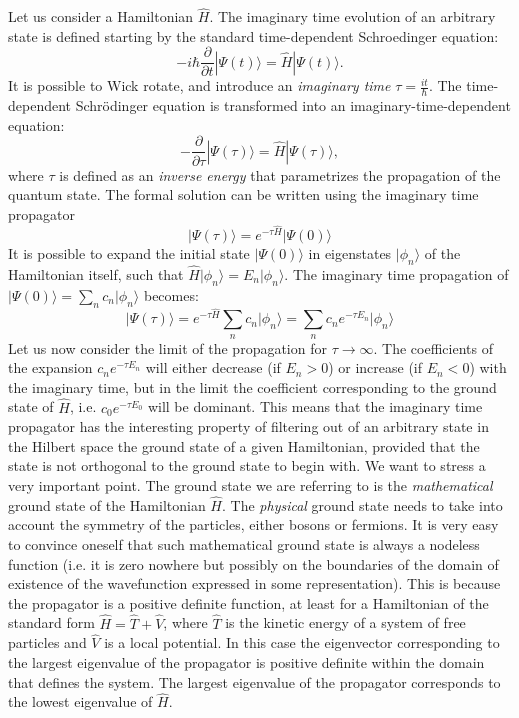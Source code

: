 Let us consider a Hamiltonian $\hat{H}$. The imaginary time evolution of an arbitrary state is defined starting by the standard time-dependent Schroedinger equation:
\begin{equation}
-i\hbar\frac{\partial}{\partial t}|\Psi(t)\rangle = \hat{H}|\Psi(t)\rangle.
\end{equation}
It is possible to Wick rotate, and introduce an {\it imaginary time} $\tau=\frac{it}{\hbar}$. The 
time-dependent Schr\"odinger equation is transformed into an imaginary-time-dependent equation:
\begin{equation}
-\frac{\partial}{\partial \tau}|\Psi(\tau)\rangle = \hat{H}|\Psi(\tau)\rangle,
\end{equation}
where
$\tau$ is defined as an {\it inverse energy} that parametrizes the propagation of the quantum state.
The formal solution can be written using the imaginary time propagator
\begin{equation}
\vert\Psi(\tau)\rangle=e^{-\tau\hat{H}}\vert\Psi(0)\rangle
\end{equation}
It is possible to expand the initial state $\vert \Psi(0)\rangle$ in eigenstates $\vert\phi_n\rangle$ of the Hamiltonian itself, such that $\hat{H}\vert\phi_n\rangle=E_n\vert\phi_n\rangle$. The imaginary time propagation of $\vert\Psi(0)\rangle=\sum_nc_n \vert\phi_n\rangle$ becomes:
\begin{equation}
\vert\Psi(\tau)\rangle=e^{-\tau\hat{H}}\sum_n c_n\vert\phi_n\rangle=
\sum_n c_n e^{-\tau E_n}\vert\phi_n\rangle
\end{equation}   
Let us now consider the limit of the propagation for $\tau\rightarrow\infty$. The coefficients of the expansion $c_n e^{-\tau E_n}$ will either decrease (if $E_n>0$) or increase (if $E_n<0$) with the
imaginary time, but in the limit the coefficient corresponding to the ground state of $\hat{H}$, i.e.
$c_0 e^{-\tau E_0}$ will be dominant. This means that the imaginary time propagator has the interesting property of filtering out of an arbitrary state in the Hilbert space the ground state
of a given Hamiltonian, provided that the state is not orthogonal to the ground state to begin with.
We want to stress a very important point. The ground state we are referring to is the {\it mathematical} ground state of the Hamiltonian $\hat{H}$. The {\it physical} ground state needs to
take into account the symmetry of the particles, either bosons or fermions.
It is very easy to convince oneself that such mathematical ground state is always a nodeless function (i.e. it is zero nowhere but possibly on the boundaries of the domain of existence of the wavefunction expressed in some representation). This is because the propagator is a positive definite function, at least for a Hamiltonian of the standard form $\hat{H}=\hat{T}+\hat{V}$, where $\hat{T}$ is the kinetic energy of a system of free particles and $\hat{V}$ is a local potential. In this case
the eigenvector corresponding to the largest eigenvalue of the propagator is positive definite within the domain that defines the system. The largest eigenvalue of the propagator corresponds to the lowest eigenvalue of $\hat{H}$.

